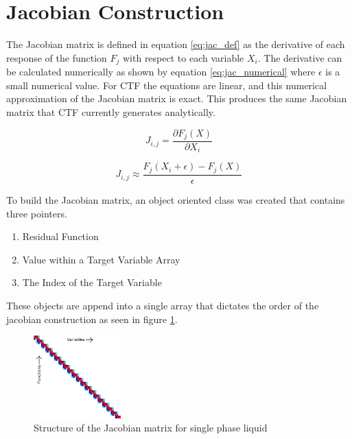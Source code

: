     \section{Jacobian Construction}
    
    The Jacobian matrix is defined in equation \eqref{eq:jac_def} as the derivative
    of each response of the function $F_{j}$ with respect to each variable $X_{i}$.
    The derivative can be calculated numerically as shown by equation
    \eqref{eq:jac_numerical} where $\epsilon$ is a small numerical value. For
    CTF the equations are linear, and this numerical approximation
    of the Jacobian matrix is exact. This produces the same Jacobian
    matrix that CTF currently generates analytically. 
    
    \begin{equation}
    	\label{eq:jac_def}
    	J_{i,j}=\frac{ \partial F_{j}(X)}{\partial X_{i}}
    \end{equation}
    
    \begin{equation}
    	\label{eq:jac_numerical}
    	J_{i,j}  \approx \frac{F_{j}(X_{i}+\epsilon)-F_{j}(X)}{\epsilon}
    \end{equation}
    
    To build the Jacobian matrix, an object oriented class was created that
    contains three pointers. 
    
    \begin{enumerate}
      \item Residual Function
      \item Value within a Target Variable Array
      \item The Index of the Target Variable
    \end{enumerate}
     
    These objects are append into a single array that dictates the order of the
    jacobian construction as seen in figure \ref{fig:Jacobian_Setup}. 
    
    \begin{figure}[!h]
    	\centering
    	\includegraphics[width=0.30\textwidth]{images/Jacobian_Setup}
    	\caption{Structure of the Jacobian matrix for single phase liquid}
    	\label{fig:Jacobian_Setup}
    \end{figure}


